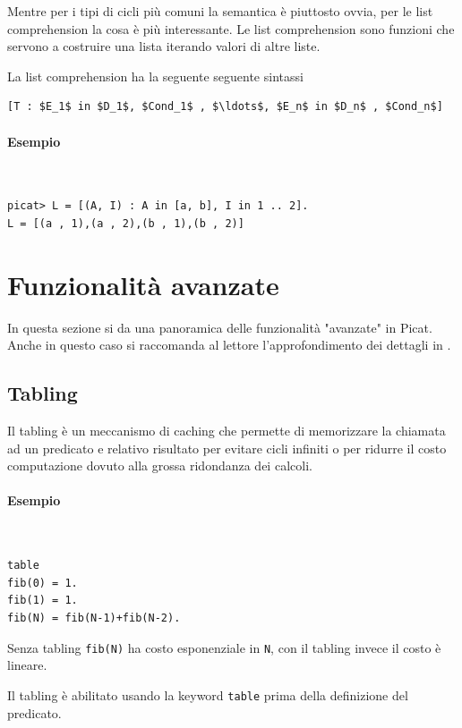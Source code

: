 \documentclass[12pt,a4paper,openright]{book} %
\begin{document}
Mentre per i tipi di cicli più comuni la semantica è piuttosto ovvia, per le list comprehension la cosa è più interessante. Le list comprehension sono funzioni che servono a costruire una lista iterando valori di altre liste.

La list comprehension ha la seguente seguente sintassi
\begin{lstlisting}
[T : $E_1$ in $D_1$, $Cond_1$ , $\ldots$, $E_n$ in $D_n$ , $Cond_n$]
\end{lstlisting}

\paragraph{Esempio}\
\begin{lstlisting}
picat> L = [(A, I) : A in [a, b], I in 1 .. 2].
L = [(a , 1),(a , 2),(b , 1),(b , 2)]
\end{lstlisting}

\section{Funzionalità avanzate}
\label{sec:picat_advanced}

In questa sezione si da una panoramica delle funzionalità "avanzate" in Picat. Anche in questo caso si raccomanda al lettore l'approfondimento dei dettagli in \cite{PicatGuide}.

\subsection{Tabling}
\label{sec:picat_advanced_tabling}

Il tabling è un meccanismo di caching che permette di memorizzare la chiamata ad un predicato e relativo risultato per evitare cicli infiniti o per ridurre il costo computazione dovuto alla grossa ridondanza dei calcoli.

\paragraph{Esempio}\
\begin{lstlisting}
table
fib(0) = 1.
fib(1) = 1.
fib(N) = fib(N-1)+fib(N-2).
\end{lstlisting}
Senza tabling \verb|fib(N)| ha costo esponenziale in \verb|N|, con il tabling invece il costo è lineare.

Il tabling è abilitato usando la keyword \verb|table| prima della definizione del predicato.
\end{document}
